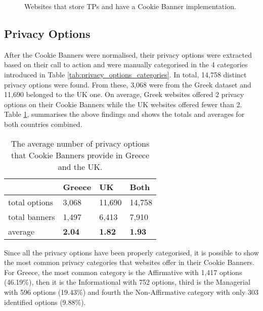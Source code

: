 \documentclass[../main.tex]{subfiles}
\begin{document}
\begin{figure}[ht]
    \centering
    \renewcommand{\bcfontstyle}{}
    \begin{bchart}[step=10,max=80, unit=\%]
        \bigskip
    \end{bchart}
    \caption{Websites that store TPs and have a Cookie Banner implementation.}
    \label{fig:prevalence_cookie_banners_tps}
\end{figure}


\subsection{Privacy Options}
After the Cookie Banners were normalised, their privacy options were extracted based on their call to action and were manually categorised in the 4 categories introduced in Table \ref{tab:privacy_options_categories}. In total, 14,758 distinct privacy options were found. From these, 3,068 were from the Greek dataset and 11,690 belonged to the UK one. On average, Greek websites offered 2 privacy options on their Cookie Banners while the UK websites offered fewer than 2. Table \ref{tab:avg_options}, summarises the above findings and shows the totals and averages for both countries combined.

\begin{table}[ht]
    \centering
    \begin{tabular}{@{}llll@{}}
        \toprule
                      & Greece         & UK             & Both          \\ \midrule
        total options & 3,068          & 11,690         & 14,758         \\
        total banners & 1,497          & 6,413          & 7,910          \\
        average       & \textbf{2.04}  & \textbf{1.82}  & \textbf{1.93} \\ \bottomrule
    \end{tabular}
    \caption{The average number of privacy options that Cookie Banners provide in Greece and the UK.}
    \label{tab:avg_options}
\end{table}

Since all the privacy options have been properly categorised, it is possible to show the most common privacy categories that websites offer in their Cookie Banners. For Greece, the most common category is the Affirmative with 1,417 options (46.19\%), then it is the Informational with 752 options, third is the Managerial with 596 options (19.43\%) and fourth the Non-Affirmative category with only 303 identified options (9.88\%).
\end{document}
